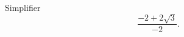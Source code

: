 
\begin{exercice}\label{exosmath-0205}

Simplifier
\begin{equation}
    \frac{ -2+2\sqrt{3} }{ -2 }.
\end{equation}

\end{exercice}
